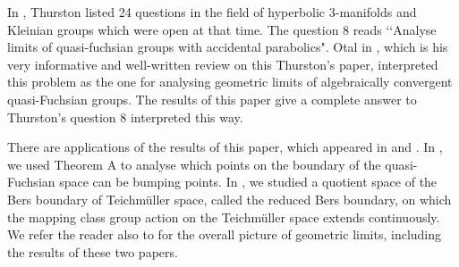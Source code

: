 \documentclass{amsart}
\theoremstyle{definition}
\numberwithin{figure}{section}
\numberwithin{equation}{section}
\newcommand{\blackboard}[1]{\ensuremath{\mathbb{#1}}}
\newcommand{\hyperbolic}{\blackboard{H}}
\def\hh{\hyperbolic}
\def\fd{\pi_1}
\def\G{\Gamma}
\def\G{\Gamma}
\begin{document}

%

%
In \cite{th2}, Thurston listed 24 questions in the field of hyperbolic 3-manifolds and Kleinian groups which were open at that time.
The question 8 reads \lq\lq Analyse limits of quasi-fuchsian groups with accidental parabolics".
Otal  in \cite{otalj}, which is his very informative and well-written review on this Thurston's paper, interpreted this problem as the one for analysing geometric limits of algebraically convergent quasi-Fuchsian groups.
The results of this paper give a complete answer to Thurston's question 8 interpreted this way. 

There are applications of the results of this paper, which appeared in \cite{OhD} and \cite{OhR}.
In \cite{OhD}, we used Theorem A to analyse which points on the boundary of the quasi-Fuchsian space can be bumping points.
In \cite{OhR}, we studied a quotient space of the Bers boundary of Teichm\"{u}ller space, called the reduced  Bers boundary, on which the mapping class group action on the Teichm\"{u}ller space extends continuously.
We refer the reader also to \cite{OhD} for the overall picture of geometric limits, including the results of these two papers.
\end{document}
